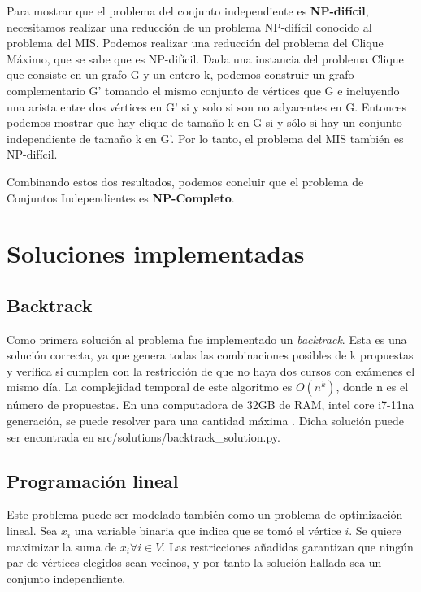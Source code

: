 \documentclass[10pt]{article} %
\begin{document}
	Para mostrar que el problema del conjunto independiente es \textbf{NP-difícil}, necesitamos realizar una reducción de un problema NP-difícil conocido al problema del MIS. Podemos realizar una reducción del problema del Clique M\'aximo, que se sabe que es NP-difícil. Dada una instancia del problema Clique que consiste en un grafo G y un entero k, podemos construir un grafo complementario G' tomando el mismo conjunto de vértices que G e incluyendo una arista entre dos vértices en G' si y solo si son no adyacentes en G. Entonces podemos mostrar que hay clique de tamaño k en G si y sólo si hay un conjunto independiente de tamaño k en G'. Por lo tanto, el problema del MIS también es NP-difícil.

	Combinando estos dos resultados, podemos concluir que el problema de Conjuntos Independientes es \textbf{NP-Completo}.
	
	\section{Soluciones implementadas}
	
	\subsection{Backtrack}
	
		Como primera solución al problema fue implementado un \textit{backtrack}. Esta es una solución correcta, ya que  genera todas las combinaciones posibles de k propuestas y verifica si cumplen con la restricción de que no haya dos cursos con exámenes el mismo día. La complejidad temporal de este algoritmo es $O(n^k)$, donde n es el número de propuestas. En una computadora de 32GB de RAM, intel core i7-11na generación, se puede resolver para una cantidad máxima . Dicha solución puede ser encontrada en src/solutions/backtrack\_solution.py.
		
	\subsection{Programaci\'on lineal}
	
	Este problema puede ser modelado tambi\'en como un problema de optimizaci\'on lineal. Sea $ x_{i} $ una variable binaria que indica que se tom\'o el v\'ertice $ i $. Se quiere maximizar la suma de $ x_i \forall i \in V $. Las restricciones a\~nadidas  garantizan que ning\'un par de v\'ertices elegidos sean vecinos, y por tanto la soluci\'on hallada sea un conjunto independiente. 
		
\end{document}
